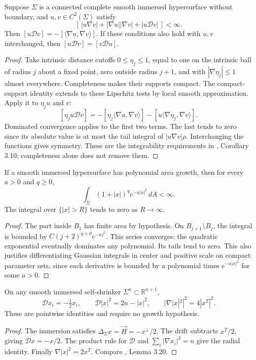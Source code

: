\begin{lemma}\label{lem:gaussian-global-parts}
Suppose $\Sigma$ is a connected complete smooth immersed hypersurface without boundary, and $u,v\in C^2(\Sigma)$ satisfy
\[
 [\,|u\nabla v|+|\nabla u||\nabla v|+|u\mathcal Dv|\,]<\infty.
\]
Then $[u\mathcal Dv]=-[\langle\nabla u,\nabla v\rangle]$. If these conditions also hold with $u,v$ interchanged, then $[u\mathcal Dv]=[v\mathcal Du]$.
\end{lemma}
\begin{proof}
Take intrinsic distance cutoffs $0\leq\eta_j\leq1$, equal to one on the intrinsic ball of radius $j$ about a fixed point, zero outside radius $j+1$, and with $|\nabla\eta_j|\leq1$ almost everywhere. Completeness makes their supports compact. The compact-support identity extends to these Lipschitz tests by local smooth approximation. Apply it to $\eta_ju$ and $v$:
\[
 [\eta_ju\mathcal Dv]=-[\eta_j\langle\nabla u,\nabla v\rangle]
 -[u\langle\nabla\eta_j,\nabla v\rangle].
\]
Dominated convergence applies to the first two terms. The last tends to zero since its absolute value is at most the tail integral of $|u\nabla v|\rho$. Interchanging the functions gives symmetry. These are the integrability requirements in \cite{CM12}, Corollary 3.10; completeness alone does not remove them.
\end{proof}

\begin{lemma}\label{lem:gaussian-polynomial-moments}
If a smooth immersed hypersurface has polynomial area growth, then for every $a>0$ and $q\geq0$,
\[
 \int_\Sigma(1+|x|)^q e^{-a|x|^2}\,dA<\infty.
\]
The integral over $\{|x|>R\}$ tends to zero as $R\to\infty$.
\end{lemma}
\begin{proof}
The part inside $B_1$ has finite area by hypothesis. On $B_{j+1}\setminus B_j$, the integral is bounded by $C(j+2)^{q+d}e^{-aj^2}$. This series converges: the quadratic exponential eventually dominates any polynomial. Its tails tend to zero. This also justifies differentiating Gaussian integrals in center and positive scale on compact parameter sets, since each derivative is bounded by a polynomial times $e^{-a|x|^2}$ for some $a>0$.
\end{proof}

\begin{proposition}\label{prop:shrinker-drift-identities}
On any smooth immersed self-shrinker $\Sigma^n\subset\mathbb R^{n+1}$,
\[
 \mathcal D x_i=-\tfrac12x_i,\qquad
 \mathcal D|x|^2=2n-|x|^2,\qquad
 |\nabla |x|^2|^2=4|x^T|^2.
\]
These are pointwise identities and require no growth hypothesis.
\end{proposition}
\begin{proof}
The immersion satisfies $\Delta_\Sigma x=\vec H=-x^\perp/2$. The drift subtracts $x^T/2$, giving $\mathcal Dx=-x/2$. The product rule for $\mathcal D$ and $\sum_i|\nabla x_i|^2=n$ give the radial identity. Finally $\nabla |x|^2=2x^T$. Compare \cite{CM12}, Lemma 3.20.
\end{proof}

